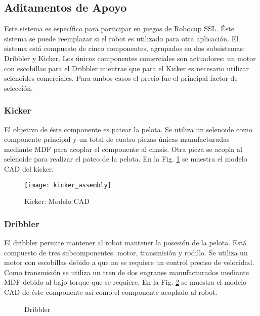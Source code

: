 \subsection{Aditamentos de Apoyo}
Este sistema es específico para participar en juegos de Robocup \gls{SSL}. Éste sistema se puede reemplazar si el robot es utilizado para otra aplicación.
El sistema está compuesto de cinco componentes, agrupados en dos subsistemas: \gls{Dribbler} y \gls{Kicker}. Los únicos componentes comerciales son actuadores: un motor con escobillas para el \gls{Dribbler} mientras que para el \gls{Kicker} es necesario utilizar selenoides comerciales. Para ambos casos el precio fue el principal factor de selección.

\subsubsection{Kicker}
El objetivo de éste componente es patear la pelota.
Se utiliza un selenoide como componente principal y un total de cuatro piezas únicas manufacturadas mediante \gls{MDF} para acoplar el componente al chasis. Otra pieza se acopla al selenoide para realizar el pateo de la pelota.
En la Fig. \ref{fig:cad_kicker} se muestra el modelo \gls{CAD} del kicker.

\begin{figure}
	\centering
		\texttt{[image: kicker\_assembly]}
	\caption{Kicker: Modelo CAD}
	\label{fig:cad_kicker}
\end{figure}

\subsubsection{Dribbler}

El dribbler permite mantener al robot mantener la posesión de la pelota.
Está compuesto de tres subcomponentes: motor, transmisión y rodillo. Se utiliza un motor con escobillas \cite{dribbler_motor} debido a que no se requiere un control preciso de velocidad. Como transmisión se utiliza un tren de dos engranes manufacturados mediante \gls{MDF} debido al bajo torque que se requiere. En la Fig. \ref{fig:dribbler_cad} se muestra el modelo \gls{CAD} de éste componente así como el componente acoplado al robot.

\begin{figure}
	\centering
		\qquad
		\qquad	
	\caption{Dribbler}
	\label{fig:dribbler_cad}
\end{figure}


